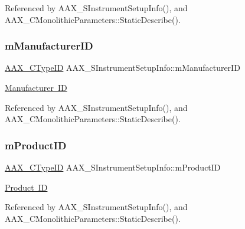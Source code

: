 Referenced by A\+A\+X\+\_\+\+S\+Instrument\+Setup\+Info(), and A\+A\+X\+\_\+\+C\+Monolithic\+Parameters\+::\+Static\+Describe().

\mbox{\label{a01957_ab28a76c6e5d7860d20b699869c108c84}} 
\subsubsection{\texorpdfstring{mManufacturerID}{mManufacturerID}}
{\footnotesize\ttfamily \mbox{\hyperlink{a00392_ac678f9c1fbcc26315d209f71a147a175}{A\+A\+X\+\_\+\+C\+Type\+ID}} A\+A\+X\+\_\+\+S\+Instrument\+Setup\+Info\+::m\+Manufacturer\+ID}



\mbox{\hyperlink{a00662_a13e384f22825afd3db6d68395b79ce0da996465cca29a2a15291d1c788ac5728c}{Manufacturer ID}} 



Referenced by A\+A\+X\+\_\+\+S\+Instrument\+Setup\+Info(), and A\+A\+X\+\_\+\+C\+Monolithic\+Parameters\+::\+Static\+Describe().

\mbox{\label{a01957_a139f8dc96e73b88a1e9f6abdfe7112c3}} 
\subsubsection{\texorpdfstring{mProductID}{mProductID}}
{\footnotesize\ttfamily \mbox{\hyperlink{a00392_ac678f9c1fbcc26315d209f71a147a175}{A\+A\+X\+\_\+\+C\+Type\+ID}} A\+A\+X\+\_\+\+S\+Instrument\+Setup\+Info\+::m\+Product\+ID}



\mbox{\hyperlink{a00662_a13e384f22825afd3db6d68395b79ce0da3a41fcdff5af1a4fd19dcbca7b1ba6f3}{Product ID}} 



Referenced by A\+A\+X\+\_\+\+S\+Instrument\+Setup\+Info(), and A\+A\+X\+\_\+\+C\+Monolithic\+Parameters\+::\+Static\+Describe().

\mbox{\label{a01957_a80d2c48d5a97190ed2ebec043d073142}} 
